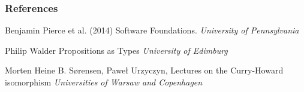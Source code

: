 \documentclass{beamer}
\begin{document}

\begin{frame}
\frametitle{References}
\footnotesize{
\begin{thebibliography}{99} %

 Benjamin Pierce et al. (2014)
  \newblock Software Foundations.
  \newblock \emph{University of Pennsylvania}

 Philip Walder
  \newblock Propositions as Types
  \newblock \emph{University of Edimburg}

 Morten Heine B. Sørensen, Paweł Urzyczyn,
  \newblock Lectures on the Curry-Howard isomorphism
  \newblock \emph{Universities of Warsaw and Copenhagen}

\end{thebibliography}
}
\end{frame}

\end{document}

